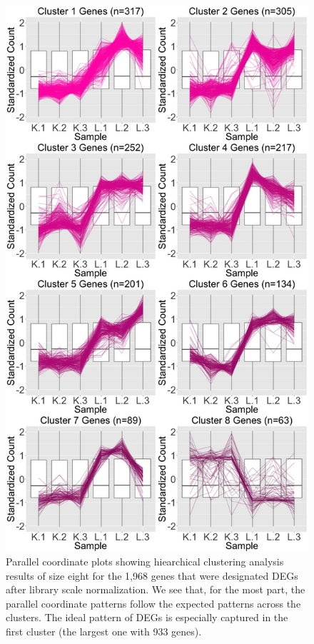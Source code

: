 \documentclass{article}
\begin{document}
\null
\begin{figure}[t!]
\centerline{\includegraphics[width=0.65\columnwidth]{../Bioinformatics/Pictures/liverKidney/Clustering_data_FDR_001_TMMvRaw_Add/K_L_8.jpg}}
\caption{Parallel coordinate plots showing hiearchical clustering analysis results of size eight for the 1,968 genes that were designated DEGs after library scale normalization. We see that, for the most part, the parallel coordinate patterns follow the expected patterns across the clusters. The ideal pattern of DEGs is especially captured in the first cluster (the largest one with 933 genes).
\label{AddPCP}}
\end{figure}
\end{document}
